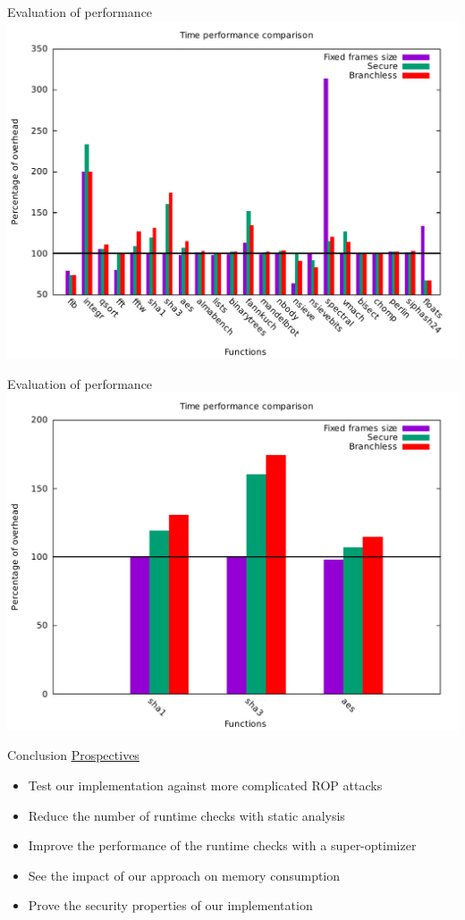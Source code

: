 \documentclass{beamer}
\begin{document}
\begin{frame}[c]{Evaluation of performance }
	\includegraphics[width=\textwidth]{images/time_percentage_graph.pdf}
\end{frame}

\begin{frame}[c]{Evaluation of performance }
	\includegraphics[width=\textwidth]{images/percentage_focus.pdf}
\end{frame}


\begin{frame}[c]{Conclusion}
	\underline{Prospectives}
	\begin{itemize}
		\item Test our implementation against more complicated ROP attacks
		\item Reduce the number of runtime checks with static analysis~\cite{Zeng:2011:CCI:2046707.2046713}
		\item Improve the performance of the runtime checks with a super-optimizer
		\item See the impact of our approach on memory consumption
		\item Prove the security properties of our implementation
	\end{itemize}
\end{frame}
\end{document}
